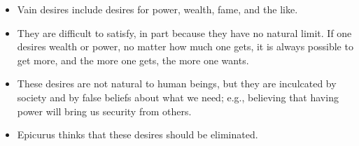 \documentclass[11pt]{article}
\begin{document}
\begin{enumerate}
  \begin{itemize}
  \item
    Vain desires include desires for power, wealth, fame, and the like.
  \item
    They are difficult to satisfy, in part because they have no natural
    limit. If one desires wealth or power, no matter how much one gets,
    it is always possible to get more, and the more one gets, the more
    one wants.
  \item
    These desires are not natural to human beings, but they are inculcated by  society and by false beliefs about what we need; e.g., believing
    that having power will bring us security from others.
  \item
    Epicurus thinks that these desires should be eliminated.
  \end{itemize}
\end{enumerate}
\end{document}
